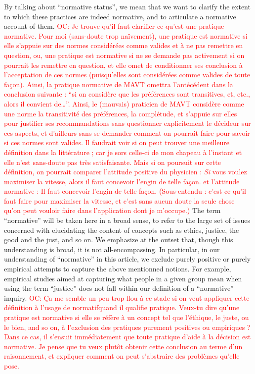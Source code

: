 \documentclass[preprint, french, english, 11pt]{elsarticle}%
\newcommand{\commentOC}[1]{\textcolor{red}{OC: #1}}
\begin{document}
By talking about ``normative status'', we mean that we want to clarify the extent to which these practices are indeed normative, and to articulate a normative account of them. 
\commentOC{Je trouve qu’il faut clarifier ce qu’est une pratique normative. Pour moi (sans-doute trop naïvement), une pratique est normative si elle s’appuie sur des normes considérées comme valides et à ne pas remettre en question, ou, une pratique est normative si ne se demande pas activement si on pourrait les remettre en question, et elle omet de conditionner ses conclusion à l’acceptation de ces normes (puisqu’elles sont considérées comme valides de toute façon). Ainsi, la pratique normative de MAVT omettra l’antécédent dans la conclusion suivante : “si on considère que les préférences sont transitives, et, etc., alors il convient de…”. Ainsi, le (mauvais) praticien de MAVT considère comme une norme la transitivité des préférences, la complétude, et s’appuie sur elles pour justifier ses recommandations sans questionner explicitement le décideur sur ces aspects, et d’ailleurs sans se demander comment on pourrait faire pour savoir si ces normes sont valides. Il faudrait voir si on peut trouver une meilleure définition dans la littérature ; car je sors celle-ci de mon chapeau à l’instant et elle n’est sans-doute pas très satisfaisante. Mais si on poursuit sur cette définition, on pourrait comparer l’attitude positive du physicien : \og{}\emph{Si} vous voulez maximiser la vitesse, alors il faut concevoir l’engin de telle façon.\fg{} et l’attitude normative : \og{}Il faut concevoir l’engin de telle façon.\fg{} (Sous-entendu : c’est ce qu’il faut faire pour maximiser la vitesse, et c’est sans aucun doute la seule chose qu’on peut vouloir faire dans l’application dont je m’occupe.)} The term ``normative'' will be taken here in a broad sense, to refer to the large set of issues concerned with elucidating the content of concepts such as ethics, justice, the good and the just, and so on. We emphasize at the outset that, though this understanding is broad, it is not all-encompassing. In particular, in our understanding of ``normative'' in this article, we exclude purely positive or purely empirical attempts to capture the above mentionned notions. For example, empirical studies aimed at capturing what people in a given group mean when using the term ``justice'' does not fall within our definition of a ``normative'' inquiry.
\commentOC{Ça me semble un peu trop flou à ce stade si on veut appliquer cette définition à l’usage de \og{}normatif\fg quand il qualifie \og{}pratique\fg. Veux-tu dire qu’une pratique est normative si elle se réfère à un concept tel que l’éthique, le juste, ou le bien, and so on, à l’exclusion des pratiques purement positives ou empiriques ? Dans ce cas, il s’ensuit immédiatement que toute pratique d’aide à la décision est normative. Je pense que tu veux plutôt obtenir cette conclusion au terme d’un raisonnement, et expliquer comment on peut s’abstraire des problèmes qu’elle pose.}
\end{document}

